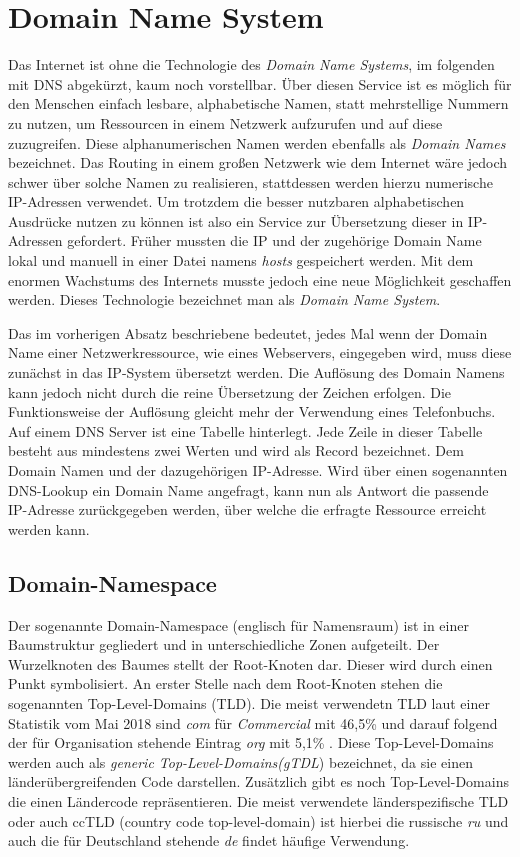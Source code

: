 
\section{Domain Name System}

Das Internet ist ohne die Technologie des \emph{Domain Name Systems}, im folgenden mit DNS abgekürzt, kaum noch vorstellbar. Über diesen Service ist es möglich für den Menschen einfach lesbare, alphabetische Namen, statt mehrstellige Nummern zu nutzen, um Ressourcen in einem Netzwerk aufzurufen und auf diese zuzugreifen. Diese alphanumerischen Namen werden ebenfalls als \emph{Domain Names} bezeichnet. Das Routing in einem großen Netzwerk wie dem Internet wäre jedoch schwer über solche Namen zu realisieren, stattdessen werden hierzu numerische IP-Adressen verwendet. Um trotzdem die besser nutzbaren alphabetischen Ausdrücke nutzen zu können ist also ein Service zur Übersetzung dieser in IP-Adressen gefordert. Früher mussten die IP und der zugehörige Domain Name lokal und manuell in einer Datei namens \textit{hosts} gespeichert werden. Mit dem enormen Wachstums des Internets musste jedoch eine neue Möglichkeit geschaffen werden. Dieses Technologie bezeichnet man als \emph{Domain Name System}. \cite{Schreiner.2016}

Das im vorherigen Absatz beschriebene bedeutet, jedes Mal wenn der Domain Name einer Netzwerkressource, wie eines Webservers, eingegeben wird, muss diese zunächst in das IP-System übersetzt werden. Die Auflösung des Domain Namens kann jedoch nicht durch die reine Übersetzung der Zeichen erfolgen. Die Funktionsweise der Auflösung gleicht mehr der Verwendung eines Telefonbuchs. Auf einem DNS Server ist eine Tabelle hinterlegt. Jede Zeile in dieser Tabelle besteht aus mindestens zwei Werten und wird als Record bezeichnet. Dem Domain Namen und der dazugehörigen IP-Adresse. Wird über einen sogenannten DNS-Lookup ein Domain Name angefragt, kann nun als Antwort die passende IP-Adresse zurückgegeben werden, über welche die erfragte Ressource erreicht werden kann.

\subsection{Domain-Namespace}
Der sogenannte Domain-Namespace (englisch für Namensraum) ist in einer Baumstruktur gegliedert und in unterschiedliche Zonen aufgeteilt. Der Wurzelknoten des Baumes stellt der Root-Knoten dar. Dieser wird durch einen Punkt symbolisiert. An erster Stelle nach dem Root-Knoten stehen die sogenannten Top-Level-Domains (TLD). Die meist verwendetn TLD laut einer Statistik vom Mai 2018 sind \textit{com} für \textit{Commercial} mit 46,5\% und darauf folgend der für Organisation stehende Eintrag \textit{org} mit 5,1\% \cite{w3techs.2018}. Diese Top-Level-Domains werden auch als \textit{generic Top-Level-Domains(gTDL}) bezeichnet, da sie einen länderübergreifenden Code darstellen. Zusätzlich gibt es noch Top-Level-Domains die einen Ländercode repräsentieren. Die meist verwendete länderspezifische TLD oder auch ccTLD (country code top-level-domain) ist hierbei die russische \textit{ru} und auch die für Deutschland stehende \textit{de} findet häufige Verwendung. \cite{IndianaUniversity.14.05.2018} 

